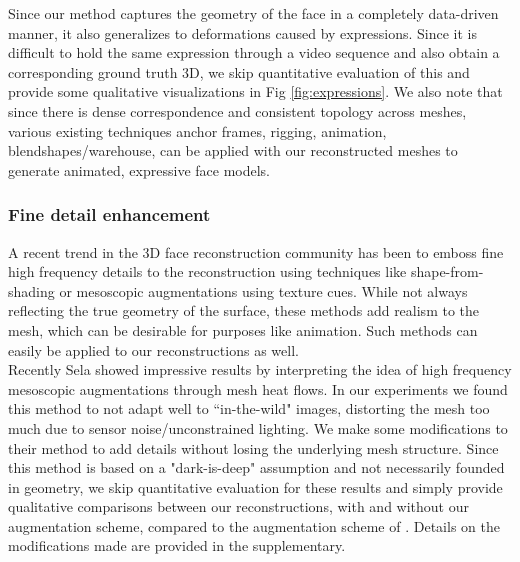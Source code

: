 \documentclass[10pt,twocolumn,letterpaper]{article}
\begin{document}
Since our method captures the geometry of the face in a completely data-driven manner, it also generalizes to deformations caused by expressions. 
Since it is difficult to hold the same expression through a video sequence and also obtain a corresponding ground truth 3D, we skip quantitative evaluation of this and provide some qualitative visualizations in Fig \ref{fig:expressions}. 
We also note that since there is dense correspondence and consistent topology across meshes, various existing techniques \cite{}  anchor frames, rigging, animation, blendshapes/warehouse, can be applied with our reconstructed meshes to generate animated, expressive face models.


\subsubsection{Fine detail enhancement}
A recent trend in the 3D face reconstruction community has been to emboss fine high frequency details to the reconstruction using techniques like shape-from-shading or mesoscopic augmentations using texture cues. While not always reflecting the true geometry of the surface, these methods add realism to the mesh, which can be desirable for purposes like animation. Such methods can easily be applied to our reconstructions as well.\\
Recently Sela \etal\cite{sela2017unrestricted} showed impressive results by interpreting the idea of high frequency mesoscopic augmentations \cite{beeler2010high} through mesh heat flows. In our experiments we found this method to not adapt well to ``in-the-wild" images, distorting the mesh too much due to sensor noise/unconstrained lighting. We make some modifications to their method to add details without losing the underlying mesh structure. 
Since this method is based on a "dark-is-deep" assumption and not necessarily founded in geometry, we skip quantitative evaluation for these results and simply provide qualitative comparisons between our reconstructions, with and without our augmentation scheme, compared to the augmentation scheme of \cite{sela2017unrestricted}. Details on the modifications made are provided in the supplementary.
\end{document}
